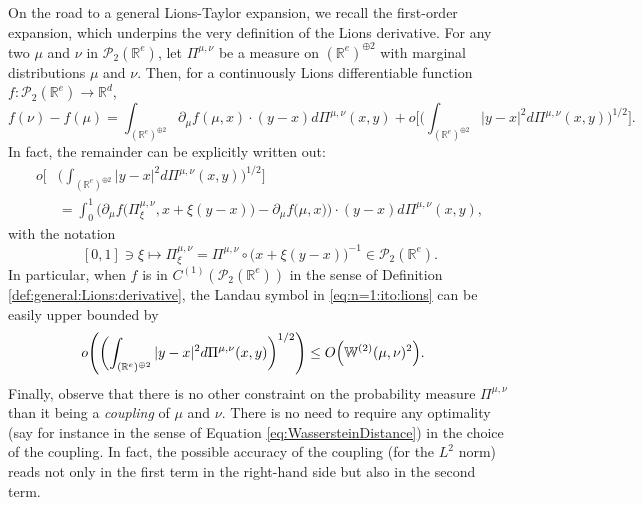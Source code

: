 \documentclass[a4paper,11pt,twoside]{article}
\numberwithin{equation}{section}
\theoremstyle{plain}
\newcommand{\bR}{\mathbb{R}}
\newcommand{\bW}{\mathbb{W}}
\newcommand{\cP}{\mathcal{P}}
\newcommand{\1}{\mathbbm{1}}
\begin{document}
	On the road to a general Lions-Taylor expansion, we recall the first-order expansion, which underpins the very definition of the Lions derivative. For any two $\mu$ and $\nu$ in $\cP_{2}(\bR^e)$, let $\Pi^{\mu, \nu}$ be a measure on $(\bR^e)^{\oplus 2}$ with marginal distributions $\mu$ and $\nu$. Then, for a continuously Lions differentiable function $f : \cP_{2}(\bR^e) \rightarrow \bR^d$,
	\begin{equation}
		\label{eq:n=1:ito:lions}
		f(\nu) - f(\mu) = \int_{(\bR^e)^{\oplus 2}} \partial_{\mu} f(\mu,x) \cdot (y-x) d \Pi^{\mu,\nu}(x,y) 
		+ 
		o \biggl[ \biggl( \int_{(\bR^e)^{\oplus 2}} |y-x|^2 d\Pi^{\mu,\nu}(x,y) \biggr)^{1/2} \biggr]. 
	\end{equation}
	In fact, the remainder can be explicitly written out:
	\begin{align}
		\nonumber
		o \biggl[& \biggl( \int_{(\bR^e)^{\oplus 2}} |y-x|^2 d\Pi^{\mu,\nu}(x,y) \biggr)^{1/2} \biggr]
		\\
		\label{eq:n=1:expression:remainder}
		&=  
		\int_{0}^1 \bigg( \partial_{\mu} f \Big( \Pi_{\xi}^{\mu,\nu}, x + \xi (y-x) \Big) - \partial_{\mu} f \Big( \mu, x \Big) \bigg) \cdot (y-x) d \Pi^{\mu,\nu}(x,y),
	\end{align}
	with the notation
	\begin{equation}
		\label{eq:Pixi}
		[0,1] \ni \xi \mapsto \Pi_\xi^{\mu, \nu} = \Pi^{\mu, \nu} \circ \Big( x + \xi(y-x)\Big)^{-1} \in \cP_2(\bR^e). 
	\end{equation}
	In particular, when $f$ is in $C^{(1)}(\cP_{2}(\bR^e))$ in the sense of 
	Definition \ref{def:general:Lions:derivative}, the Landau symbol in \eqref{eq:n=1:ito:lions} can be easily upper bounded by
	\begin{equation}
		\label{eq:n=1:bound:remainder}
		\begin{split}
			o \Bigg( \biggl( \int_{(\bR^e)^{\oplus 2}} |y-x|^2 d\Pi^{\mu,\nu}(x,y) \biggr)^{1/2} \Bigg)
			&\leq O \Bigl( \bW^{(2)}(\mu,\nu)^2 \Bigr).
		\end{split}
	\end{equation}
	Finally, observe that there is no other constraint on the probability measure $\Pi^{\mu,\nu}$ than it being a \textit{coupling} of $\mu$ and $\nu$. There is no need to require any optimality (say for instance in the sense of Equation \eqref{eq:WassersteinDistance}) in the choice of the coupling. In fact, the possible accuracy of the coupling (for the $L^2$ norm) reads not only in the first term in the right-hand side but also in the second term.
	
\end{document}
